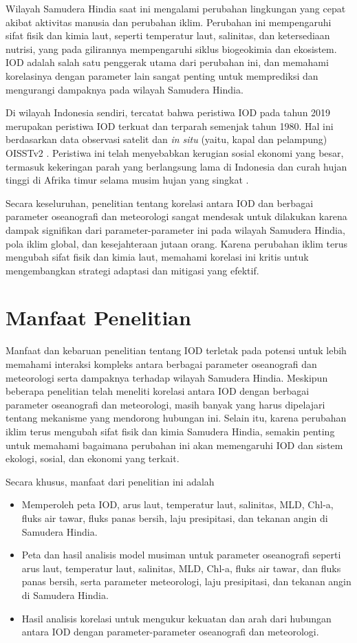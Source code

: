 \begin{spacing}{1.5}
	Wilayah Samudera Hindia saat ini mengalami perubahan lingkungan yang cepat akibat aktivitas manusia dan perubahan iklim. Perubahan ini mempengaruhi sifat fisik dan kimia laut, seperti temperatur laut, salinitas, dan ketersediaan nutrisi, yang pada gilirannya mempengaruhi siklus biogeokimia dan ekosistem. IOD adalah salah satu penggerak utama dari perubahan ini, dan memahami korelasinya dengan parameter lain sangat penting untuk memprediksi dan mengurangi dampaknya pada wilayah Samudera Hindia.

	Di wilayah Indonesia sendiri, tercatat bahwa peristiwa IOD pada tahun 2019 merupakan peristiwa IOD terkuat dan terparah semenjak tahun 1980. Hal ini berdasarkan data observasi satelit dan \textit{in situ} (yaitu, kapal dan pelampung) OISSTv2 \cite{Reynolds2002}. Peristiwa ini telah menyebabkan kerugian sosial ekonomi yang besar, termasuk kekeringan parah yang berlangsung lama di Indonesia dan curah hujan tinggi di Afrika timur selama musim hujan yang singkat \cite{Bo2020}.
	
	Secara keseluruhan, penelitian tentang korelasi antara IOD dan berbagai parameter oseanografi dan meteorologi sangat mendesak untuk dilakukan karena dampak signifikan dari parameter-parameter ini pada wilayah Samudera Hindia, pola iklim global, dan kesejahteraan jutaan orang. Karena perubahan iklim terus mengubah sifat fisik dan kimia laut, memahami korelasi ini kritis untuk mengembangkan strategi adaptasi dan mitigasi yang efektif.
	\section[Manfaat Penelitian]{Manfaat Penelitian}
	
	Manfaat dan kebaruan penelitian tentang IOD terletak pada potensi untuk lebih memahami interaksi kompleks antara berbagai parameter oseanografi dan meteorologi serta dampaknya terhadap wilayah Samudera Hindia. Meskipun beberapa penelitian telah meneliti korelasi antara IOD dengan berbagai parameter oseanografi dan meteorologi, masih banyak yang harus dipelajari tentang mekanisme yang mendorong hubungan ini.
	Selain itu, karena perubahan iklim terus mengubah sifat fisik dan kimia Samudera Hindia, semakin penting untuk memahami bagaimana perubahan ini akan memengaruhi IOD dan sistem ekologi, sosial, dan ekonomi yang terkait. 
	
	Secara khusus, manfaat dari penelitian ini adalah
	\begin{itemize}
		\item Memperoleh peta IOD, arus laut, temperatur laut, salinitas, MLD, Chl-a, fluks air tawar, fluks panas bersih, laju presipitasi, dan tekanan angin di Samudera Hindia.
		\item Peta dan hasil analisis model musiman untuk parameter oseanografi seperti arus laut, temperatur laut, salinitas, MLD, Chl-a, fluks air tawar, dan fluks panas bersih, serta parameter meteorologi, laju presipitasi, dan tekanan angin di Samudera Hindia.
		\item Hasil analisis korelasi untuk mengukur kekuatan dan arah dari hubungan antara IOD dengan parameter-parameter oseanografi dan meteorologi.
	\end{itemize}
	

\end{spacing}
